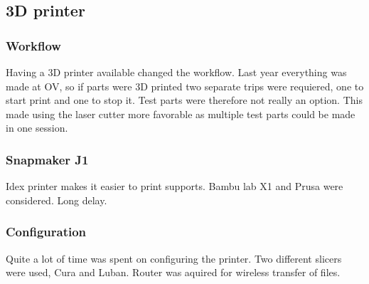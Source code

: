 \subsection{3D printer}

\subsubsection{Workflow}
Having a 3D printer available changed the workflow.
Last year everything was made at OV, so if parts were 3D printed two separate trips were requiered, one to start print and one to stop it.
Test parts were therefore not really an option.
This made using the laser cutter more favorable as multiple test parts could be made in one session.

\subsubsection{Snapmaker J1}
Idex printer makes it easier to print supports.
Bambu lab X1 and Prusa were considered.
Long delay.

\subsubsection{Configuration}
Quite a lot of time was spent on configuring the printer.
Two different slicers were used, Cura and Luban.
Router was aquired for wireless transfer of files.
